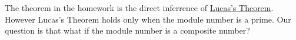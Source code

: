 The theorem in the homework is the direct inferrence of \href{https://www.wikiwand.com/en/Lucas's\_theorem}{Lucas's Theorem}.
However Lucas's Theorem holds only when the module number is a prime.
Our question is that what if the module number is a composite number?
